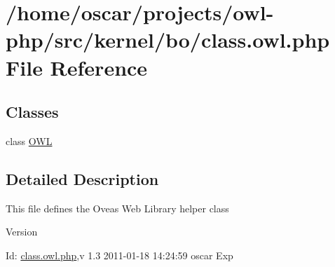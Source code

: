 \section{/home/oscar/projects/owl-\/php/src/kernel/bo/class.owl.php File Reference}
\label{class_8owl_8php}
\subsection*{Classes}
\begin{DoxyCompactItemize}
\item 
class \hyperlink{classOWL}{OWL}
\end{DoxyCompactItemize}


\subsection{Detailed Description}
This file defines the Oveas Web Library helper class \begin{DoxyVersion}{Version}

\end{DoxyVersion}
\begin{DoxyParagraph}{Id:}
\hyperlink{class_8owl_8php}{class.owl.php},v 1.3 2011-\/01-\/18 14:24:59 oscar Exp 
\end{DoxyParagraph}
